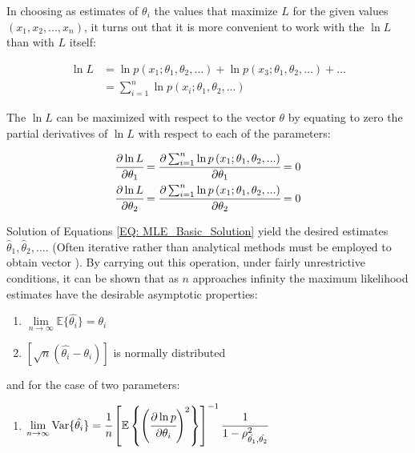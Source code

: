 \documentclass[a4paper,fleqn]{cas-dc}
\begin{document}
In choosing as estimates of $\theta_i$ the values that maximize $L$ for the given values $\left( x_1, x_2, ..., x_n \right)$, it turns out that it is more convenient to work with the $\ln L$ than with $L$ itself:

{\footnotesize 
\begin{align}
	\ln L &= \ln p \left( x_1; \theta_1, \theta_2, ... \right) + \ln p\left( x_3; \theta_1, \theta_2, ... \right) + ... \nonumber \\
	&= \sum_{i=1}^{n} \ln p\left( x_i; \theta_1, \theta_2, ... \right)
\end{align} }

The $\ln L$ can be maximized with respect to the vector $\theta$ by equating to zero the partial derivatives of $\ln L$ with respect to each of the parameters:

{\footnotesize
\begin{align}\label{EQ: MLE_Basic_Solution}
	\cfrac{\partial \ln L}{\partial \theta_1} &= \cfrac{\partial \sum_{i=1}^{n} \ln p\left( x_1; \theta_1, \theta_2, ... \right) }{\partial \theta_1} = 0 \nonumber \\
	\cfrac{\partial \ln L}{\partial \theta_2} &= \cfrac{\partial \sum_{i=1}^{n} \ln p\left( x_1; \theta_1, \theta_2, ... \right) }{\partial \theta_2} = 0
\end{align} }

Solution of Equations \ref{EQ: MLE_Basic_Solution} yield the desired estimates $\hat{\theta}_1, \hat{\theta}_2, ...$. (Often iterative rather than analytical methods must be employed to obtain vector \boldsymbol{$\hat{\theta}$}). By carrying out this operation, under fairly unrestrictive conditions, it can be shown that as $n$ approaches infinity the maximum likelihood estimates have the desirable asymptotic properties:

\begin{enumerate}[label=(\arabic*)]
	\item {\footnotesize $\lim\limits_{n \rightarrow \infty} \mathbb{E}\{\hat{\theta_i}\} = \theta_i$ }
	\item {\footnotesize $\left[ \sqrt{n}\left( \hat{\theta_i} - \theta_i \right) \right]$ } is normally distributed
\end{enumerate}
and for the case of two parameters:

\begin{enumerate}[resume,label=(\arabic*)]
	\item {\footnotesize $\lim\limits_{n \rightarrow \infty} \text{Var}\{\hat{\theta_i}\} = \cfrac{1}{n} \left[ \mathbb{E} \left\{ \left( \cfrac{\partial \ln p}{\partial \theta_i} \right)^2 \right\} \right]^{-1} \cfrac{1}{1-\rho^2_{\hat{\theta_1}, \hat{\theta_2}}} $ } \label{Assumption_MLE}
\end{enumerate}
\end{document}
